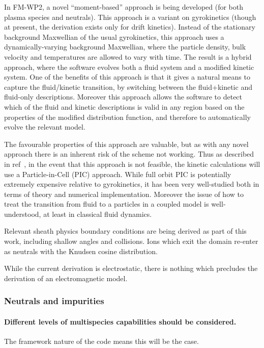 In FM-WP2, a novel ``moment-based'' approach is being developed (for both
plasma species and neutrals).
This approach is a variant on gyrokinetics (though at present, the derivation
exists only for drift kinetics).
Instead of the stationary background Maxwellian of the usual gyrokinetics, this
approach uses a dynamically-varying background Maxwellian, where the
particle density, bulk velocity and temperatures are allowed to vary with time.
The result is a hybrid approach, where the software evolves both a fluid system
and a modified kinetic system.
One of the benefits of this approach is that it gives a natural means to
capture the fluid/kinetic transition, by switching between the fluid+kinetic
and fluid-only descriptions.
Moreover this approach allows the software to detect which of the fluid and kinetic
descriptions is valid in any region based on the properties of the modified
distribution function, and therefore to automatically evolve the relevant
model.

The favourable properties of this approach are valuable,
but as with any novel approach there is an inherent risk of the scheme not
working.  Thus as described in ref~\cite[\S\,1.1]{pappeqs2}, in the event that
this approach is not feasible, the kinetic calculations
will use a Particle-in-Cell (PIC) approach.
While full orbit PIC is potentially extremely expensive relative to gyrokinetics,
it has been very well-studied both in terms of theory and numerical implementation.
Moreover the issue of how to treat the transition from fluid to a particles in
a coupled model is well-understood, at least in classical fluid dynamics.

Relevant sheath physics boundary conditions are being derived as part of this
work, including shallow angles and collisions.
Ions which exit the domain re-enter as neutrals with the Knudsen cosine
distribution.

While the current derivation is electrostatic, there is nothing which precludes
the derivation of an electromagnetic model.


\subsubsection{Neutrals and impurities}

\paragraph{Different levels of multispecies capabilities should be considered.}
The framework nature of the code means this will be the case.


